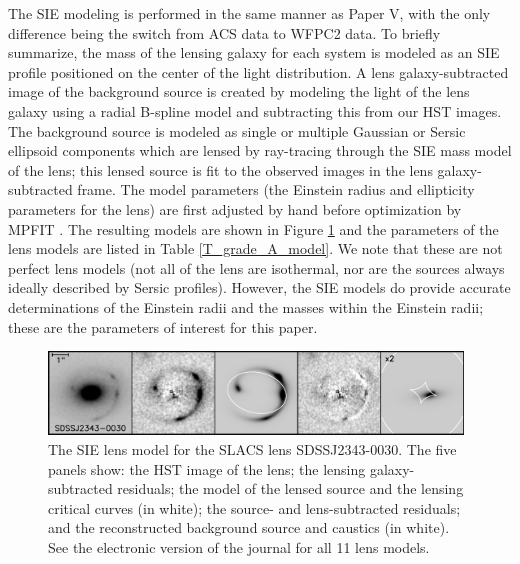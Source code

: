 \documentclass[iop]{emulateapj}
\begin{document}
The SIE modeling is performed in the same manner as Paper V, with the only difference being the switch from ACS data to WFPC2 data. To briefly summarize, the mass of the lensing galaxy for each system is modeled as an SIE profile positioned on the center of the light distribution. A lens galaxy-subtracted image of the background source is created by modeling the light of the lens galaxy using a radial B-spline model and subtracting this from our HST images. The background source is modeled as single or multiple Gaussian or Sersic ellipsoid components which are lensed by ray-tracing through the SIE mass model of the lens; this lensed source is fit to the observed images in the lens galaxy-subtracted frame. The model parameters (the Einstein radius and ellipticity parameters for the lens) are first adjusted by hand before optimization by MPFIT \citep{mpfit}. The resulting models are shown in Figure \ref{F_lens_models} and the parameters of the lens models are listed in Table \ref{T_grade_A_model}. We note that these are not perfect lens models (not all of the lens are isothermal, nor are the sources always ideally described by Sersic profiles). However, the SIE models do provide accurate determinations of the Einstein radii and the masses within the Einstein radii; these are the parameters of interest for this paper.

\begin{figure}[ht]
 \includegraphics[width=0.98\textwidth,clip]{f3j.eps}
 \caption{The SIE lens model for the SLACS lens SDSSJ2343-0030. The five panels show: the HST image of the lens; the lensing galaxy-subtracted residuals; the model of the lensed source and the lensing critical curves (in white); the source- and lens-subtracted residuals; and the reconstructed background source and caustics (in white). See the electronic version of the journal for all 11 lens models.}
 \label{F_lens_models}
\end{figure}
\end{document}
